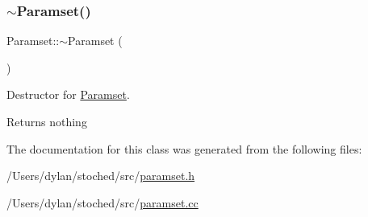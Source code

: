 \subsubsection{\texorpdfstring{$\sim$\+Paramset()}{~Paramset()}}
{\footnotesize\ttfamily Paramset\+::$\sim$\+Paramset (\begin{DoxyParamCaption}{ }\end{DoxyParamCaption})}



Destructor for \hyperlink{class_paramset}{Paramset}. 

\begin{DoxyReturn}{Returns}
nothing 
\end{DoxyReturn}


The documentation for this class was generated from the following files\+:\begin{DoxyCompactItemize}
\item 
/\+Users/dylan/stoched/src/\hyperlink{paramset_8h}{paramset.\+h}\item 
/\+Users/dylan/stoched/src/\hyperlink{paramset_8cc}{paramset.\+cc}\end{DoxyCompactItemize}
